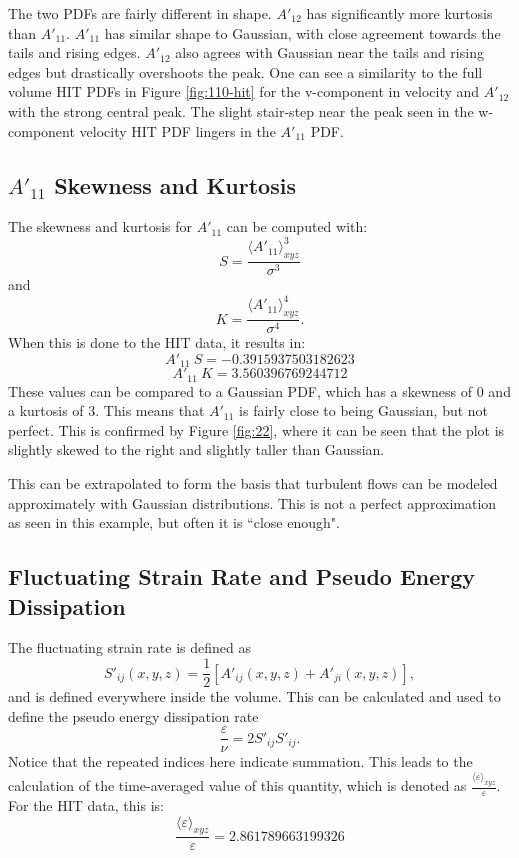 \documentclass[12pt]{article}
\begin{document}
The two PDFs are fairly different in shape. $A'_{12}$ has significantly more kurtosis than $A'_{11}$. $A'_{11}$ has similar shape to Gaussian, with close agreement towards the tails and rising edges. $A'_{12}$ also agrees with Gaussian near the tails and rising edges but drastically overshoots the peak. One can see a similarity to the full volume HIT PDFs in Figure \ref{fig:110-hit} for the v-component in velocity and $A'_{12}$ with the strong central peak. The slight stair-step near the peak seen in the w-component velocity HIT PDF lingers in the $A'_{11}$ PDF. 

\subsection{$A'_{11}$ Skewness and Kurtosis}
The skewness and kurtosis for $A'_{11}$ can be computed with:
\[
S = \frac{\langle A'_{11}\rangle_{xyz}^3}{\sigma^3}
\]
and 
\[
K = \frac{\langle A'_{11}\rangle_{xyz}^4}{\sigma^4}.
\]
When this is done to the HIT data, it results in:
\[
A'_{11}~S = -0.3915937503182623
\]
\[
A'_{11}~K = 3.560396769244712
\]
These values can be compared to a Gaussian PDF, which has a skewness of 0 and a kurtosis of 3. This means that $A'_{11}$ is fairly close to being Gaussian, but not perfect. This is confirmed by Figure \ref{fig:22}, where it can be seen that the plot is slightly skewed to the right and slightly taller than Gaussian. 

This can be extrapolated to form the basis that turbulent flows can be modeled approximately with Gaussian distributions. This is not a perfect approximation as seen in this example, but often it is ``close enough". 

\subsection{Fluctuating Strain Rate and Pseudo Energy Dissipation}
The fluctuating strain rate is defined as 
\[
S'_{ij}(x,y,z) = \frac{1}{2}\left[ A'_{ij}(x,y,z)+A'_{ji}(x,y,z) \right],
\]
and is defined everywhere inside the volume. This can be calculated and used to define the pseudo energy dissipation rate 
\[
\frac{\varepsilon}{\nu}=2S'_{ij}S'_{ij}.
\]
Notice that the repeated indices here indicate summation. This leads to the calculation of the time-averaged value of this quantity, which is denoted as $\frac{\langle \varepsilon\rangle_{xyz}}{\varepsilon}$. For the HIT data, this is:
\[
\frac{\langle \varepsilon\rangle_{xyz}}{\varepsilon} = 2.861789663199326
\]
\end{document}
